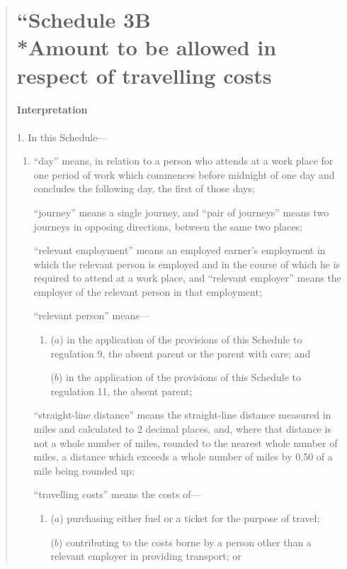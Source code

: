 \documentclass[a4paper]{article}
\begin{document}
\begin{quotation}
\part*{``Schedule 3B\\*Amount to be allowed in respect of travelling costs}

\subsection*{Interpretation}

1.  In this Schedule—
\begin{enumerate}\item[]
“day” means, in relation to a person who attends at a work place for one period of work which commences before midnight of one day and concludes the following day, the first of those days;

“journey” means a single journey, and “pair of journeys” means two journeys in opposing directions, between the same two places;

“relevant employment” means an employed earner’s employment in which the relevant person is employed and in the course of which he is required to attend at a work place, and “relevant employer” means the employer of the relevant person in that employment;

“relevant person” means—
\begin{enumerate}\item[]
($a$) in the application of the provisions of this Schedule to regulation 9, the absent parent or the parent with care; and

($b$) in the application of the provisions of this Schedule to regulation 11, the absent parent;
\end{enumerate}

“straight-line distance” means the straight-line distance measured in miles and calculated to 2 decimal places, and, where that distance is not a whole number of miles, rounded to the nearest whole number of miles, a distance which exceeds a whole number of miles by 0.50 of a mile being rounded up;

“travelling costs” means the costs of—
\begin{enumerate}\item[]
($a$) purchasing either fuel or a ticket for the purpose of travel;

($b$) contributing to the costs borne by a person other than a relevant employer in providing transport; or


\end{enumerate}
\end{enumerate}
\end{quotation}
\end{document}
